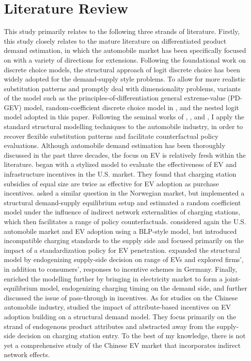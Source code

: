 \documentclass[12pt]{article}
\begin{document}
\section{Literature Review}
\hspace*{\parindent} This study primarily relates to the following three strands of literature. Firstly, this study closely relates to the mature literature on differentiated product demand estimation, 
in which the automobile market has been specifically focused on with a variety of directions for extensions. 
Following the foundational work on discrete choice models, the structural approach of logit discrete choice has been widely adopted for the demand-supply style problems. 
To allow for more realistic substitution patterns and promptly deal with dimensionality problems, 
variants of the model such as the principles-of-differentiation general extreme-value (PD-GEV) model, random-coefficient discrete choice model in \citet{berry_automobile_1995}, and the nested logit model \citep{cardell_variance_1997} adopted in this paper. 
Following the seminal works of \citet{bresnahan_competition_1987}, \citet{berry_automobile_1995}, and \citet{petrin_quantifying_2002}, I apply the standard structural modelling techniques to the automobile industry, 
in order to recover flexible substitution patterns and facilitate counterfactual policy evaluations. Although automobile demand estimation has been thoroughly discussed in the past three decades, 
the focus on EV is relatively fresh within the literature. \citet{li_market_2017} began with a stylized model to evaluate the effectiveness of EV and infrastructure incentives in the U.S. market. 
They found that charging station subsidies of equal size are twice as effective for EV adoption as purchase incentives. 
\citet{springel_network_2021} asked a similar question in the Norwegian market, but implemented a structural demand-supply equilibrium setup and estimated a random coefficient model under the influence of indirect network externalities of charging stations, 
which then facilitates a range of policy counterfactuals. \citet{li_compatibility_2023} considered again the U.S. automobile market and EV adoption using a BLP-style model, 
but introduced incompatible charging standards to the supply side and focused primarily on the impact of a standardization policy for EV penetration. 
\citet{remmy_adjustable_2024} expanded the structural model by endogenizing supply-side decision on range of EVs and explored firms', in addition to consumers', responses to incentive schemes in Germany. 
Finally, \citet{heid_equilibrium_2024} enriched the modelling further by bringing in electricity market to form a joint-equilibrium model, endogenizing charging timing on the demand side, and further discussed the issue of pass-through in incentives. 
As for studies on the Chinese automobile industry, \citet{barwick_attribute-based_2024} studied the impact of attribute-based incentives on EV adoption building on a structural demand model. 
They focus primarily on the strand of endogenous product attributes and abstracted away from the supply-side decision on charging station entry. 
To the best of my knowledge, there is not yet a comprehensive study of the Chinese EV market that incorporates indirect network effects.\\
\end{document}
